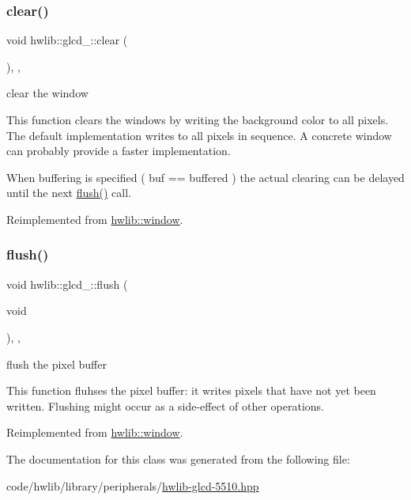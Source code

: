 \subsubsection{\texorpdfstring{clear()}{clear()}}
{\footnotesize\ttfamily void hwlib\+::glcd\+\_\+::clear (\begin{DoxyParamCaption}{ }\end{DoxyParamCaption})\hspace{0.3cm}{\ttfamily [inline]}, {\ttfamily [override]}, {\ttfamily [virtual]}}



clear the window 

This function clears the windows by writing the background color to all pixels. The default implementation writes to all pixels in sequence. A concrete window can probably provide a faster implementation.

When buffering is specified ( buf == buffered ) the actual clearing can be delayed until the next \hyperlink{classhwlib_1_1glcd__5510_ac53cb29b0973166ae3f54940a71317bf}{flush()} call. 

Reimplemented from \hyperlink{classhwlib_1_1window_a5e781163353ce26cb4dc5b2cbe40ad05}{hwlib\+::window}.

\mbox{\label{classhwlib_1_1glcd__5510_ac53cb29b0973166ae3f54940a71317bf}} 
\subsubsection{\texorpdfstring{flush()}{flush()}}
{\footnotesize\ttfamily void hwlib\+::glcd\+\_\+::flush (\begin{DoxyParamCaption}\item[{void}]{ }\end{DoxyParamCaption})\hspace{0.3cm}{\ttfamily [inline]}, {\ttfamily [override]}, {\ttfamily [virtual]}}



flush the pixel buffer 

This function fluhses the pixel buffer\+: it writes pixels that have not yet been written. Flushing might occur as a side-\/effect of other operations. 

Reimplemented from \hyperlink{classhwlib_1_1window_a2b654a98872d174173e1df24a444c949}{hwlib\+::window}.



The documentation for this class was generated from the following file\+:\begin{DoxyCompactItemize}
\item 
code/hwlib/library/peripherals/\hyperlink{hwlib-glcd-5510_8hpp}{hwlib-\/glcd-\/5510.\+hpp}\end{DoxyCompactItemize}
